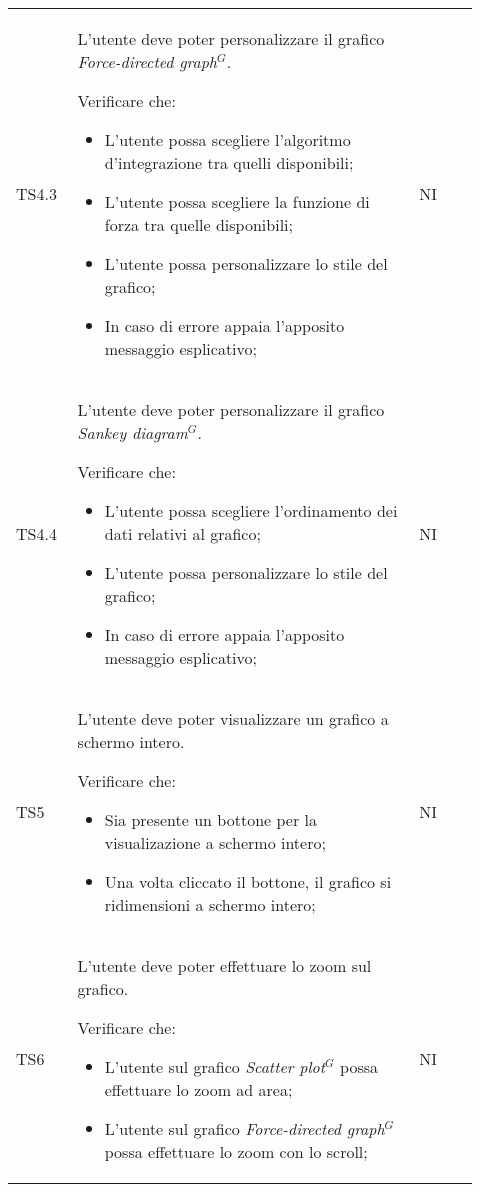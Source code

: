 \begin{longtable}{p{0.12\linewidth}p{0.68\linewidth}p{0.12\linewidth}}
    \rowcolor[RGB]{233, 245, 206}
    TS4.3 &
    L'utente deve poter personalizzare il grafico \textit{Force-directed graph}$^{G}$. \par
    Verificare che:
    \begin{itemize}
        \item L'utente possa scegliere l'algoritmo d'integrazione tra quelli disponibili;
        \item L'utente possa scegliere la funzione di forza tra quelle disponibili;
        \item L'utente possa personalizzare lo stile del grafico;
        \item In caso di errore appaia l'apposito messaggio esplicativo;
    \end{itemize}&
    NI \\ 

    \rowcolor[RGB]{216, 235, 171}
    TS4.4 &
    L'utente deve poter personalizzare il grafico \textit{Sankey diagram}$^{G}$. \par
    Verificare che:
    \begin{itemize}
        \item L'utente possa scegliere l'ordinamento dei dati relativi al grafico;
        \item L'utente possa personalizzare lo stile del grafico;
        \item In caso di errore appaia l'apposito messaggio esplicativo;
    \end{itemize}&
    NI \\

    \rowcolor[RGB]{233, 245, 206}
    TS5 &
    L'utente deve poter visualizzare un grafico a schermo intero. \par 
    Verificare che:
    \begin{itemize}
        \item Sia presente un bottone per la visualizazione a schermo intero;
        \item Una volta cliccato il bottone, il grafico si ridimensioni a schermo intero;
    \end{itemize}&
    NI \\

    \rowcolor[RGB]{216, 235, 171}
    TS6 &
    L'utente deve poter effettuare lo zoom sul grafico. \par 
    Verificare che:
    \begin{itemize}
        \item L'utente sul grafico \textit{Scatter plot}$^{G}$ possa effettuare lo zoom ad area;
        \item L'utente sul grafico \textit{Force-directed graph}$^{G}$ possa effettuare lo zoom con lo scroll;
    \end{itemize}&
    NI \\


\end{longtable}
